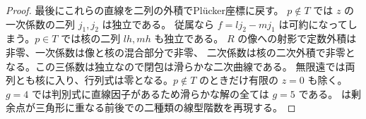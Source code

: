 \begin{proof}
最後にこれらの直線を二列の外積でPl\"ucker座標に戻す。
$p\notin T$ では $z$ の一次係数の二列 $j_1,j_2$ は独立である。
従属なら $f=l j_2-m j_1$ は可約になってしまう。$p\in T$ では核の二列 $lh,mh$ も独立である。
$R$ の像への射影で定数外積は非零、一次係数は像と核の混合部分で非零、
二次係数は核の二次外積で非零となる。この三係数は独立なので閉包は滑らかな二次曲線である。
無限遠では両列とも核に入り、行列式は零となる。$p\notin T$ のときだけ有限の $z=0$ も除く。
$g=4$ では判別式に直線因子があるため滑らかな解の全ては $g=5$ である。
は剰余点が三角形に重なる前後での二種類の線型階数を再現する。
\end{proof}
